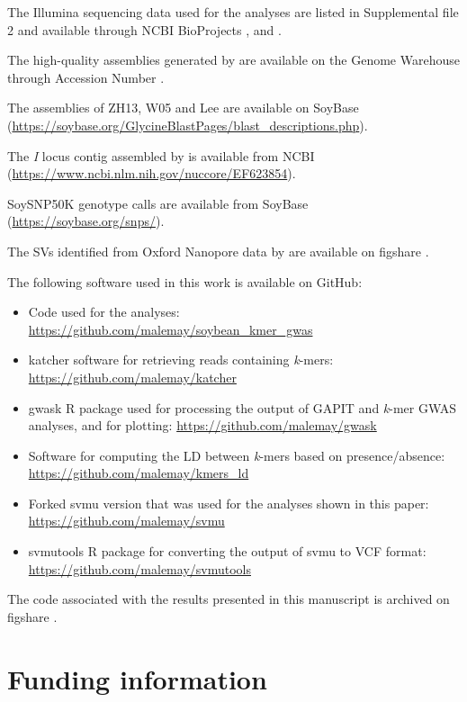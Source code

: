 \documentclass{article}
\begin{document}
The Illumina sequencing data used for the analyses are listed in Supplemental file 2
and available through NCBI BioProjects \citeauthor{PRJNA257011}, \citeauthor{PRJNA289660}
and \citeauthor{PRJNA639876}.

The high-quality assemblies generated by  are available
on the Genome Warehouse through Accession Number \citeauthor{PRJCA002030}.

The assemblies of ZH13, W05 and Lee are available on SoyBase
(\url{https://soybase.org/GlycineBlastPages/blast_descriptions.php}).

The \textit{I} locus contig assembled by  is available from
NCBI (\url{https://www.ncbi.nlm.nih.gov/nuccore/EF623854}).

SoySNP50K genotype calls are available from SoyBase (\url{https://soybase.org/snps/}).

The SVs identified from Oxford Nanopore data by  are available
on figshare .

The following software used in this work is available on GitHub:

\begin{itemize}
	\item Code used for the analyses:
		\url{https://github.com/malemay/soybean_kmer_gwas}
	\item katcher software for retrieving reads containing \textit{k}-mers:
		\url{https://github.com/malemay/katcher}
	\item gwask R package used for processing the output of GAPIT and
		\textit{k}-mer GWAS analyses, and for plotting:
		\url{https://github.com/malemay/gwask}
	\item Software for computing the LD between \textit{k}-mers
		based on presence/absence: \url{https://github.com/malemay/kmers_ld}
	\item Forked svmu version that was used for the analyses shown in this
		paper: \url{https://github.com/malemay/svmu}
	\item svmutools R package for converting the output of svmu to VCF
		format: \url{https://github.com/malemay/svmutools}
\end{itemize}

The code associated with the results presented in this manuscript is archived
on figshare .

\section*{Funding information}
\end{document}
